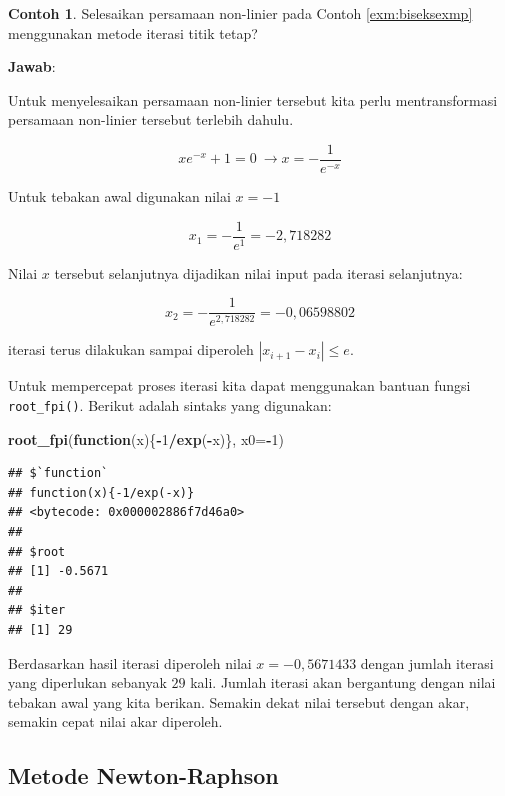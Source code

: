 \documentclass[
]{book}
\newenvironment{Shaded}{\begin{snugshade}}{\end{snugshade}}
\newcommand{\AttributeTok}[1]{\textcolor[rgb]{0.13,0.29,0.53}{#1}}
\newcommand{\ControlFlowTok}[1]{\textcolor[rgb]{0.13,0.29,0.53}{\textbf{#1}}}
\newcommand{\DecValTok}[1]{\textcolor[rgb]{0.00,0.00,0.81}{#1}}
\newcommand{\FunctionTok}[1]{\textcolor[rgb]{0.13,0.29,0.53}{\textbf{#1}}}
\newcommand{\NormalTok}[1]{#1}
\newcommand{\SpecialCharTok}[1]{\textcolor[rgb]{0.81,0.36,0.00}{\textbf{#1}}}
\theoremstyle{definition}
\theoremstyle{definition}
\newtheorem{example}{Contoh}[chapter]
\theoremstyle{definition}
\theoremstyle{definition}
\theoremstyle{remark}
\begin{document}
\begin{example}
\protect\hypertarget{exm:fixexmp}{}\label{exm:fixexmp}Selesaikan persamaan non-linier pada Contoh \ref{exm:biseksexmp} menggunakan metode iterasi titik tetap?
\end{example}

\textbf{Jawab}:

Untuk menyelesaikan persamaan non-linier tersebut kita perlu mentransformasi persamaan non-linier tersebut terlebih dahulu.

\[
xe^{-x}+1=0\ \to x=-\frac{1}{e^{-x}}
\]

Untuk tebakan awal digunakan nilai \(x=-1\)

\[
x_1 = -\frac{1}{e^{1}}=-2,718282
\]

Nilai \(x\) tersebut selanjutnya dijadikan nilai input pada iterasi selanjutnya:

\[
x_2 = -\frac{1}{e^{2,718282}}=-0,06598802
\]

iterasi terus dilakukan sampai diperoleh \(\left| x_{i+1}-x_i \right|\le e\).

Untuk mempercepat proses iterasi kita dapat menggunakan bantuan fungsi \texttt{root\_fpi()}. Berikut adalah sintaks yang digunakan:

\begin{Shaded}
\begin{Highlighting}[]
\FunctionTok{root\_fpi}\NormalTok{(}\ControlFlowTok{function}\NormalTok{(x)\{}\SpecialCharTok{{-}}\DecValTok{1}\SpecialCharTok{/}\FunctionTok{exp}\NormalTok{(}\SpecialCharTok{{-}}\NormalTok{x)\}, }\AttributeTok{x0=}\SpecialCharTok{{-}}\DecValTok{1}\NormalTok{)}
\end{Highlighting}
\end{Shaded}

\begin{verbatim}
## $`function`
## function(x){-1/exp(-x)}
## <bytecode: 0x000002886f7d46a0>
## 
## $root
## [1] -0.5671
## 
## $iter
## [1] 29
\end{verbatim}

Berdasarkan hasil iterasi diperoleh nilai \(x=-0,5671433\) dengan jumlah iterasi yang diperlukan sebanyak \(29\) kali. Jumlah iterasi akan bergantung dengan nilai tebakan awal yang kita berikan. Semakin dekat nilai tersebut dengan akar, semakin cepat nilai akar diperoleh.

\hypertarget{newtonraphson}{%
\subsection{Metode Newton-Raphson}\label{newtonraphson}}
\end{document}
